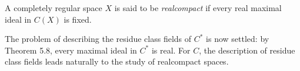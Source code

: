 A completely regular space $X$ is said to be \emph{realcompact} if every real maximal ideal in $C(X)$ is fixed.

The problem of describing the residue class fields of $C^*$ is now settled: by Theorem 5.8, every maximal ideal in $C^*$ is real. For $C$, the description of residue class fields leads naturally to the study of realcompact spaces.
